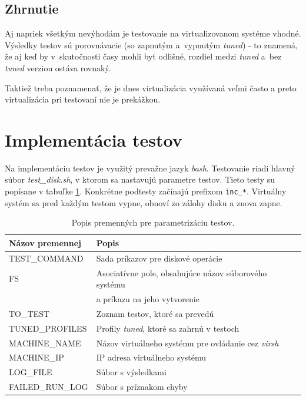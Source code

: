 \subsection{Zhrnutie}

Aj napriek všetkým nevýhodám je testovanie na virtualizovanom systéme vhodné.
Výsledky testov sú porovnávacie (so zapnutým a~vypnutým \emph{tuned}) - to
znamená, že aj keď by v~skutočnosti časy mohli byť odlišné, rozdiel medzi
\emph{tuned} a~bez \emph{tuned} verziou ostáva rovnaký.

Taktiež treba poznamenať, že je dnes virtualizácia využívaná veľmi často a
preto virtualizácia pri testovaní nie je prekážkou.

%
%

\section{Implementácia testov}

Na implementáciu testov je využitý prevažne jazyk \emph{bash}. Testovanie riadi
hlavný súbor \emph{test\_disk.sh}, v ktorom sa nastavujú parametre testov.
Tieto testy su popísane v tabuľke \ref{tab:test-params}. Konkrétne podtesty
začínajú prefixom \texttt{inc\_*}. Virtuálny systém sa pred každým testom
vypne, obnoví zo zálohy disku a znova zapne.

\begin{table}[H]
\begin{center}
\begin{tabular}{|l|l|}
    \hline
    \textbf{Názov premennej} & \textbf{Popis} \\
    \hline
    TEST\_COMMAND       & Sada príkazov pre diskové operácie \\
    FS                  & Asociatívne pole, obsahujúce názov súborového systému \\ & a príkazu na jeho vytvorenie \\
    TO\_TEST            & Zoznam testov, ktoré sa prevedú \\
    TUNED\_PROFILES     & Profily \emph{tuned}, ktoré sa zahrnú v testoch \\
    MACHINE\_NAME       & Názov virtuálneho systému pre ovládanie cez \emph{virsh} \\
    MACHINE\_IP         & IP adresa virtuálneho systému \\
    LOG\_FILE           & Súbor s výsledkami \\
    FAILED\_RUN\_LOG    & Súbor s príznakom chyby \\
    \hline
\end{tabular}
\caption{Popis premenných pre parametrizáciu testov.}
\label{tab:test-params}
\end{center}
\end{table}

